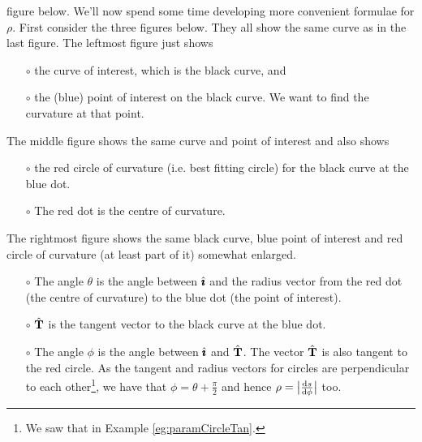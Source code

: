 figure below.
We'll now spend some time developing more convenient formulae for $\rho$.
First consider the three figures below. They all show the same curve
as in the last figure. The leftmost figure just shows
\begin{itemize}\itemsep1pt \parskip0pt  %
\item[$\circ$]
the curve of interest, which is the black curve, and
\item[$\circ$]
the (blue) point of interest on the black curve. We want to find the curvature
at that point.
\end{itemize}
The middle figure shows the same curve and point of interest and also 
shows  
\begin{itemize}\itemsep1pt \parskip0pt  %
\item[$\circ$]
the red circle of curvature (i.e. best fitting circle) for the black curve 
at the blue dot.
\item[$\circ$]
The red dot is the centre of curvature.
\end{itemize}
The rightmost figure shows the same black curve, blue point of interest
and red circle of curvature (at least part of it) somewhat enlarged.
\begin{itemize}\itemsep1pt \parskip0pt  %
\item[$\circ$]
The angle $\theta$ is the angle between $\hat{\pmb{\imath}}$ and the radius
vector from the red dot (the centre of curvature) to the blue dot
(the point of interest). 
\item[$\circ$] 
$\hat{\mathbf{T}}$ is the tangent vector to the black curve at the blue
dot. 
\item[$\circ$]  
The angle $\phi$ is the angle between $\hat{\pmb{\imath}}$ and $\hat{\mathbf{T}}$. 
The vector $\hat{\mathbf{T}}$ is also tangent to the red circle. As 
the tangent and radius vectors for circles are perpendicular to 
each other\footnote{We saw that in Example \ref{eg:paramCircleTan}.}, 
we have that $\phi=\theta+\frac{\pi}{2}$ and hence 
$\rho = \big|\diff{s}{\phi}\big|$ too.
\end{itemize}
